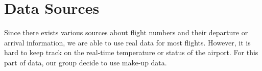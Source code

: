 \documentclass{article}
\begin{document}
	\section{Data Sources}
	Since there exists various sources about flight numbers and their departure or arrival information, we are able to use real data for most flights. However, it is hard to keep track on the real-time temperature or status of the airport. For this part of data, our group decide to use make-up data.
	
\end{document}
